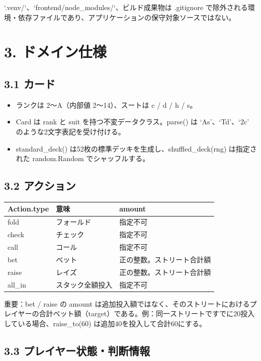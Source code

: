 \documentclass[
]{article}
\begin{document}
`.venv/`、`frontend/node\_modules/`、ビルド成果物は .gitignore
で除外される環境・依存ファイルであり、アプリケーションの保守対象ソースではない。

\section{3. ドメイン仕様}\label{ux30c9ux30e1ux30a4ux30f3ux4ed5ux69d8}

\subsection{3.1 カード}\label{ux30abux30fcux30c9}

\begin{itemize}
\item
  ランクは 2～A（内部値 2～14）、スートは c / d / h / s。
\item
  Card は rank と suit を持つ不変データクラス。parse() は
  `As'、`Td'、`2c' のような2文字表記を受け付ける。
\item
  standard\_deck() は52枚の標準デッキを生成し、shuffled\_deck(rng)
  は指定された random.Random でシャッフルする。
\end{itemize}

\subsection{3.2 アクション}\label{ux30a2ux30afux30b7ux30e7ux30f3}

\begin{longtable}[]{@{}lll@{}}
\toprule\noalign{}
Action.type & 意味 & amount \\
\midrule\noalign{}
\endhead
\bottomrule\noalign{}
\endlastfoot
fold & フォールド & 指定不可 \\
check & チェック & 指定不可 \\
call & コール & 指定不可 \\
bet & ベット & 正の整数。ストリート合計額 \\
raise & レイズ & 正の整数。ストリート合計額 \\
all\_in & スタック全額投入 & 指定不可 \\
\end{longtable}

重要：bet / raise の amount
は追加投入額ではなく、そのストリートにおけるプレイヤーの合計ベット額（target）である。例：同一ストリートですでに20投入している場合、raise\_to(60)
は追加40を投入して合計60にする。

\subsection{3.3
プレイヤー状態・判断情報}\label{ux30d7ux30ecux30a4ux30e4ux30fcux72b6ux614bux5224ux65adux60c5ux5831}
\end{document}
